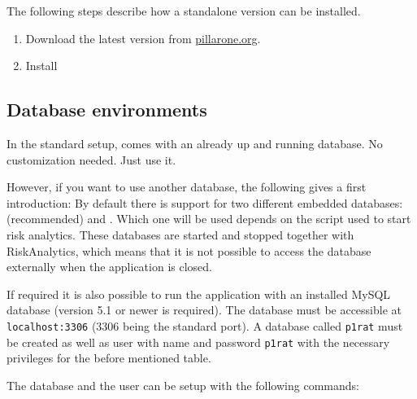 The following steps describe how a standalone version can be installed. 

\begin{enumerate}
	\item Download the latest version from \href{http://pillarone.org/products/modelling}{pillarone.org}.\\ 
	\item Install
\end{enumerate}

\subsection{Database environments}

In the standard setup, \PO \RA{}comes with an already up and running database. No customization needed. Just use it. 

However, if you want to use another database, the following gives a first introduction: By default there is support for two different embedded databases:  (recommended) and . Which one will be used depends on the script used to start risk analytics.
These databases are started and stopped together with RiskAnalytics, which means that it is not possible to access the database externally when the application is closed.

If required it is also possible to run the application with an installed MySQL database (version 5.1 or newer is required).
The database must be accessible at \texttt{localhost:3306} (3306 being the standard port). A database called \texttt{p1rat} must be created as well as user with name and password \texttt{p1rat}
with the necessary privileges for the before mentioned table.

The database and the user can be setup with the following commands:


